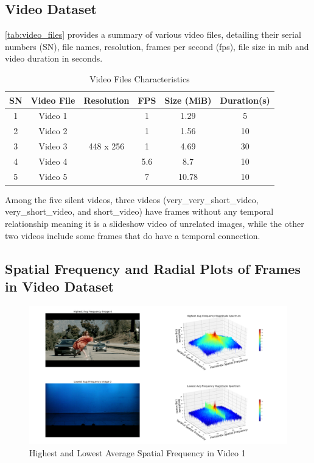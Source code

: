 \documentclass{ioereport}
\begin{document}
\subsection{Video Dataset}

\autoref{tab:video_files} provides a summary of various video files, detailing their serial numbers (SN), file names, resolution, frames per second (fps), file size in \gls{mib} and video duration in seconds.

\begin{table}[H]
    \centering
    \caption{Video Files Characteristics}
    \label{tab:video_files}
    \begin{tabular}{|c|c|c|c|c|c|}
        \hline
        \textbf{SN} & \textbf{Video File} & \textbf{Resolution} & \textbf{FPS} & \textbf{Size (MiB)} & \textbf{Duration(s)}\\ 
        \hline 
        1 & Video 1 & \multirow{5}{*}{448 x 256} & 1 & 1.29 & 5\\ 
        \cline{2-2} \cline{4-6}
        2 & Video 2 & & 1 & 1.56 & 10\\ 
        \cline{2-2} \cline{4-6}
        3 & Video 3 & & 1 & 4.69 & 30 \\ 
        \cline{2-2} \cline{4-6}
        4 & Video 4 & & 5.6 & 8.7 & 10\\ 
        \cline{2-2} \cline{4-6}
        5 & Video 5 & & 7 & 10.78 & 10\\ 
        \hline
    \end{tabular}
    \end{table}

Among the five silent videos, three videos (very\_very\_short\_video, very\_short\_video, and short\_video) have frames without any temporal relationship meaning it is a slideshow video of unrelated images, while the other two videos include some frames that do have a temporal connection.


\subsection{Spatial Frequency and Radial Plots of Frames in Video Dataset}
\begin{figure}[H]
    \centering
    \includegraphics[width=\linewidth]{assets/spatial_frequency/video1spatialfreq.png}
    \caption{Highest and Lowest Average Spatial Frequency in Video 1}
    \label{fig:spatial-frequency-1}
\end{figure}
\end{document}
